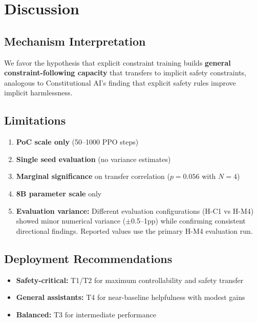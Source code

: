 \section{Discussion}
\label{sec:discussion}

\subsection{Mechanism Interpretation}

We favor the hypothesis that explicit constraint training builds \textbf{general constraint-following capacity} that transfers to implicit safety constraints, analogous to Constitutional AI's finding that explicit safety rules improve implicit harmlessness.

\subsection{Limitations}

\begin{enumerate}
    \item \textbf{PoC scale only} (50--1000 PPO steps)
    \item \textbf{Single seed evaluation} (no variance estimates)
    \item \textbf{Marginal significance} on transfer correlation ($p=0.056$ with $N=4$)
    \item \textbf{8B parameter scale} only
    \item \textbf{Evaluation variance:} Different evaluation configurations (H-C1 vs H-M4) showed minor numerical variance ($\pm$0.5--1pp) while confirming consistent directional findings. Reported values use the primary H-M4 evaluation run.
\end{enumerate}

\subsection{Deployment Recommendations}

\begin{itemize}
    \item \textbf{Safety-critical:} T1/T2 for maximum controllability and safety transfer
    \item \textbf{General assistants:} T4 for near-baseline helpfulness with modest gains
    \item \textbf{Balanced:} T3 for intermediate performance
\end{itemize}
